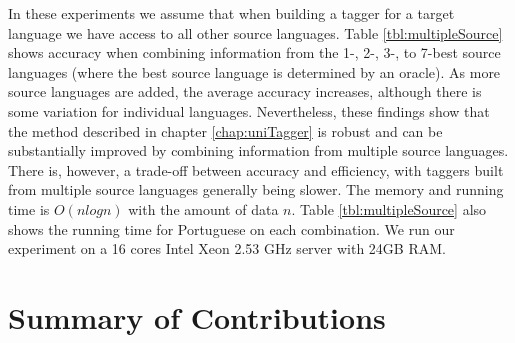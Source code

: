 In these experiments we assume that when building a tagger for a
target language we have access to all other source languages. Table
\ref{tbl:multipleSource} shows accuracy when combining information
from the \mbox{1-,} \mbox{2-,} \mbox{3-,} to 7-best source languages
(where the best source language is determined by an oracle). As more
source languages are added, the average accuracy increases, although
there is some variation for individual languages. Nevertheless, these
findings show that the method described in chapter \ref{chap:uniTagger} is robust and can be substantially improved by combining information from multiple source
languages. There is, however, a trade-off between accuracy and
efficiency, with taggers built from multiple source languages
generally being slower.
The memory and running time is $O(nlogn)$ with the amount of data $n$. Table \ref{tbl:multipleSource} also shows the running time for
 Portuguese on each combination. We run our experiment on a 16 cores Intel Xeon 2.53 GHz server with 24GB RAM. 

\section{Summary of Contributions}

